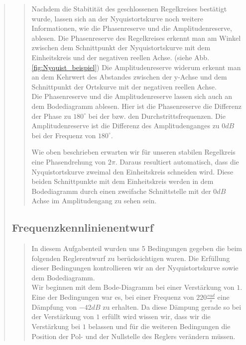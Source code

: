 \begin{quote}
\begin{quote}
        
        Nachdem die Stabitität des geschlossenen Regelkreises bestätigt wurde, lassen sich an der Nyquistortskurve noch weitere
        Informationen, wie die Phasenreserve und die Amplitudenreserve, ablesen. Die Phasenreserve des Regelkreises erkennt
        man am Winkel zwischen dem Schnittpunkt der Nyquistortskurve mit dem Einheitskreis und der negativen reellen
        Achse. (siehe Abb. \ref{fig:Nyquist_beispiel}) Die Amplitudenreserve widerum erkennt man an dem Kehrwert des Abstandes
        zwischen der y-Achse und dem Schnittpunkt der Ortskurve mit der negativen reellen Achse.\\
        Die Phasenreserve und die Amplitudenreserve lassen sich auch an dem Bodediagramm ablesen. Hier ist die
        Phasenreserve die Differenz der Phase zu $180^{\circ}$ bei der bzw. den Durchstrittsfrequenzen. Die Amplitudenreserve
        ist die Differenz des Amplitudenganges zu $0dB$ bei der Frequenz von $180^{\circ}$.\vspace{1em}
        
        Wie oben beschrieben erwarten wir für unseren stabilen Regelkreis eine Phasendrehung von $2\pi$. Daraus resultiert
        automatisch, dass die Nyquistortskurve zweimal den Einheitskreis schneiden wird. Diese beiden Schnittpunkte mit dem
        Einheitskreis werden in dem Bodediagramm durch einen zweifache Schnittstelle mit der $0dB$ Achse im Amplitudengang zu
        sehen sein.
        
        
    \end{quote} %
    
    \subsection{Frequenzkennlinienentwurf}
    \begin{quote}
        In diesem Aufgabenteil wurden uns 5 Bedingungen gegeben die beim folgenden Reglerentwurf zu berücksichtigen
        waren. Die Erfüllung dieser Bedingungen kontrollieren wir an der Nyquistortskurve sowie dem Bodediagramm.\\
        Wir beginnen mit dem Bode-Diagramm bei einer Verstärkung von $1$. Eine der Bedingungen war es, bei einer Frequenz
        von $220 \frac{rad}{s}$ eine Dämpfung von $-42 dB$ zu erhalten. Da diese Dämpung gerade so bei der Verstärkung
        von $1$ erfüllt wird wissen wir, dass wir die Verstärkung bei $1$ belassen und für die weiteren Bedingungen die
        Position der Pol- und der Nullstelle des Reglers verändern müssen.\vspace{1em}
        

\end{quote}
\end{quote}
